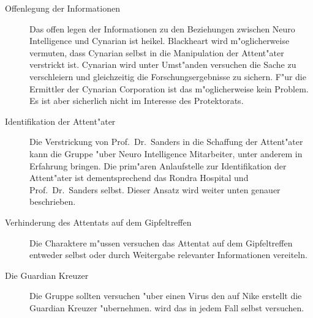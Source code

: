 \begin{description}
	\item[Offenlegung der Informationen] Das offen legen der Informationen zu den Beziehungen zwischen Neuro Intelligence und Cynarian 		
		ist heikel. Blackheart wird m"oglicherweise vermuten, dass Cynarian selbst in die Manipulation der Attent"ater verstrickt ist. Cynarian wird unter Umst"anden versuchen die Sache zu verschleiern und gleichzeitig die Forschungsergebnisse zu 	sichern. F"ur die Ermittler der Cynarian Corporation ist das m"oglicherweise kein Problem. Es ist aber sicherlich nicht im Interesse des Protektorats.
	\item[Identifikation der Attent"ater] Die Verstrickung von Prof.~Dr.~Sanders in die Schaffung der Attent"ater kann die Gruppe "uber 	
		Neuro Intelligence Mitarbeiter, unter anderem \ml{} in Erfahrung bringen. Die prim"aren Anlaufstelle zur Identifikation der Attent"ater ist dementsprechend das Rondra Hospital und Prof.~Dr.~Sanders selbst. Dieser Ansatz wird weiter unten genauer beschrieben.
	\item[Verhinderung des Attentats auf dem Gipfeltreffen] Die Charaktere m"ussen versuchen das Attentat auf dem Gipfeltreffen entweder 
		selbst oder durch Weitergabe relevanter Informationen vereiteln.
	\item[Die Guardian Kreuzer] Die Gruppe sollten versuchen "uber einen Virus den \ml{} auf Nike erstellt die Guardian Kreuzer 
		"ubernehmen. \xl{} wird das in jedem Fall selbst versuchen.
\end{description}
